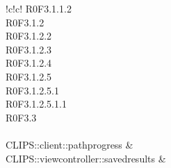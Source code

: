 \begin{tabella}{!{\VRule}c!{\VRule}c!{\VRule}}
{				R0F3.1.1.2 \\
				R0F3.1.2 \\
				R0F3.1.2.2 \\
				R0F3.1.2.3 \\
				R0F3.1.2.4 \\
				R0F3.1.2.5 \\
				R0F3.1.2.5.1 \\
				R0F3.1.2.5.1.1 \\
				R0F3.3 \\
			} \\ 
	CLIPS::client::pathprogress  &  \\
	CLIPS::viewcontroller::savedresults &  \\
			

\end{tabella}
